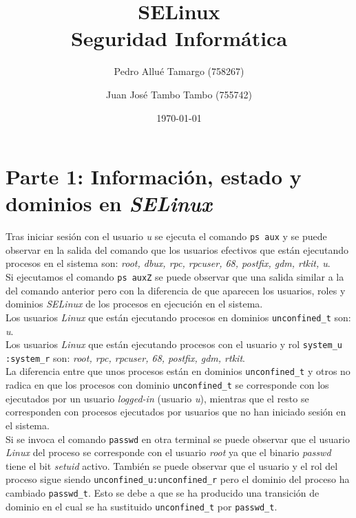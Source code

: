 \documentclass[10pt,a4paper]{article}
\begin{document}
\begin{titlepage}
\title{\textbf{
	{\Huge SELinux}\\
	{\Large Seguridad Informática}
}}
\author{
	Pedro Allué Tamargo (758267)
	\and
	Juan José Tambo Tambo (755742)
}
\date{\today}
\clearpage\maketitle
\thispagestyle{empty}
\tableofcontents
\end{titlepage}

\section{Parte 1: Información, estado y dominios en \emph{SELinux}}

Tras iniciar sesión con el usuario \emph{u} se ejecuta el comando \texttt{ps aux} y se puede observar en la salida del comando que los usuarios efectivos que están ejecutando procesos en el sistema son: \emph{root, dbux, rpc, rpcuser, 68, postfix, gdm, rtkit, u}.\\

Si ejecutamos el comando \texttt{ps auxZ} se puede observar que una salida similar a la del comando anterior pero con la diferencia de que aparecen los usuarios, roles y dominios \emph{SELinux} de los procesos en ejecución en el sistema.\\

Los usuarios \emph{Linux} que están ejecutando procesos en dominios \texttt{unconfined\_{}t} son: \emph{u}.\\
Los usuarios \emph{Linux} que están ejecutando procesos con el usuario y rol \texttt{system\_{}u :system\_{}r} son: \emph{root, rpc, rpcuser, 68, postfix, gdm, rtkit}.\\
La diferencia entre que unos procesos están en dominios \texttt{unconfined\_{}t} y otros no radica en que los procesos con dominio \texttt{unconfined\_{}t} se corresponde con los ejecutados por un usuario \emph{logged-in} (usuario \emph{u}), mientras que el resto se corresponden con procesos ejecutados por usuarios que no han iniciado sesión en el sistema.\\

Si se invoca el comando \texttt{passwd} en otra terminal se puede observar que el usuario \emph{Linux} del proceso se corresponde con el usuario \emph{root} ya que el binario \emph{passwd} tiene el bit \emph{setuid} activo. También se puede observar que el usuario y el rol del proceso sigue siendo \texttt{unconfined\_{}u:unconfined\_{}r} pero el dominio del proceso ha cambiado \texttt{passwd\_{}t}. Esto se debe a que se ha producido una transición de dominio en el cual se ha sustituido \texttt{unconfined\_{}t} por \texttt{passwd\_{}t}.\\
\end{document}
